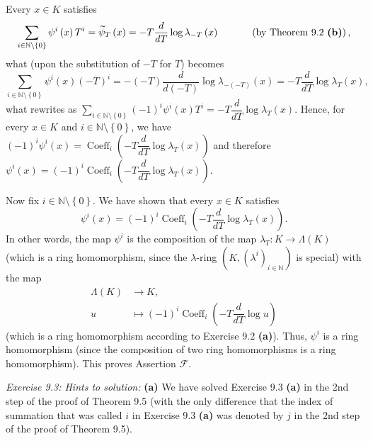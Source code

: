 \documentclass[numbers=enddot,12pt,final,onecolumn,notitlepage]{scrartcl}%
\begin{document}
Every $x\in K$ satisfies%
\[
\sum\limits_{i\in\mathbb{N}\setminus\left\{  0\right\}  }\psi^{i}\left(
x\right)  T^{i}=\widetilde{\psi}_{T}\left(  x\right)  =-T\dfrac{d}{dT}%
\log\lambda_{-T}\left(  x\right)  \ \ \ \ \ \ \ \ \ \ \left(  \text{by Theorem
9.2 \textbf{(b)}}\right)  ,
\]
what (upon the substitution of $-T$ for $T$) becomes%
\[
\sum\limits_{i\in\mathbb{N}\setminus\left\{  0\right\}  }\psi^{i}\left(
x\right)  \left(  -T\right)  ^{i}=-\left(  -T\right)  \dfrac{d}{d\left(
-T\right)  }\log\lambda_{-\left(  -T\right)  }\left(  x\right)  =-T\dfrac
{d}{dT}\log\lambda_{T}\left(  x\right)  ,
\]
what rewrites as $\sum\limits_{i\in\mathbb{N}\setminus\left\{  0\right\}
}\left(  -1\right)  ^{i}\psi^{i}\left(  x\right)  T^{i}=-T\dfrac{d}{dT}%
\log\lambda_{T}\left(  x\right)  $. Hence, for every $x\in K$ and
$i\in\mathbb{N}\setminus\left\{  0\right\}  $, we have $\left(  -1\right)
^{i}\psi^{i}\left(  x\right)  =\operatorname*{Coeff}\nolimits_{i}\left(
-T\dfrac{d}{dT}\log\lambda_{T}\left(  x\right)  \right)  $ and therefore
$\psi^{i}\left(  x\right)  =\left(  -1\right)  ^{i}\operatorname*{Coeff}%
\nolimits_{i}\left(  -T\dfrac{d}{dT}\log\lambda_{T}\left(  x\right)  \right)
$.

Now fix $i\in\mathbb{N}\setminus\left\{  0\right\}  $. We have shown that
every $x\in K$ satisfies
\[
\psi^{i}\left(  x\right)  =\left(  -1\right)  ^{i}\operatorname*{Coeff}%
\nolimits_{i}\left(  -T\dfrac{d}{dT}\log\lambda_{T}\left(  x\right)  \right)
.
\]
In other words, the map $\psi^{i}$ is the composition of the map $\lambda
_{T}:K\rightarrow\Lambda\left(  K\right)  $ (which is a ring homomorphism,
since the $\lambda$-ring $\left(  K,\left(  \lambda^{i}\right)  _{i\in
\mathbb{N}}\right)  $ is special) with the map%
\begin{align*}
\Lambda\left(  K\right)   &  \rightarrow K,\\
u  &  \mapsto\left(  -1\right)  ^{i}\operatorname*{Coeff}\nolimits_{i}\left(
-T\dfrac{d}{dT}\log u\right)
\end{align*}
(which is a ring homomorphism according to Exercise 9.2 \textbf{(a)}). Thus,
$\psi^{i}$ is a ring homomorphism (since the composition of two ring
homomorphisms is a ring homomorphism). This proves Assertion $\mathcal{F}$.

\textit{Exercise 9.3: Hints to solution:} \textbf{(a)} We have solved Exercise
9.3 \textbf{(a)} in the 2nd step of the proof of Theorem 9.5 (with the only
difference that the index of summation that was called $i$ in Exercise 9.3
\textbf{(a)} was denoted by $j$ in the 2nd step of the proof of Theorem 9.5).
\end{document}
